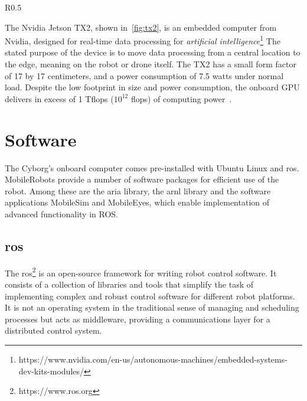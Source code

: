 \documentclass[\rootfolder/main.tex]{subfiles}
\begin{document}
\begin{wrapfigure}{R}{0.5\columnwidth}
    \caption[Nvidia Jetson TX2 development kit.]{Nvidia Jetson TX2 development kit, image courtesy of Nvidia.}
    \label{fig:tx2}
\end{wrapfigure}

The Nvidia Jetson TX2, shown in~\cref{fig:tx2}, is an embedded computer from Nvidia, designed for real-time data processing for \emph{artificial intelligence}\footnote{https://www.nvidia.com/en-us/autonomous-machines/embedded-systems-dev-kits-modules/}
The stated purpose of the device is to move data processing from a central location to the edge, meaning on the robot or drone itself.
The TX2 has a small form factor of 17 by 17 centimeters, and a power consumption of 7.5 watts under normal load.
Despite the low footprint in size and power consumption, the onboard GPU delivers in excess of 1 T\acrshort{flops} ($10^{12}$ \acrlong{flops}) of computing power~\cite{Nvidia2017}.


\section{Software}

The Cyborg's onboard computer comes pre-installed with Ubuntu Linux and \acrshort{ros}.
MobileRobots provide a number of software packages for efficient use of the robot. 
Among these are the \acrfull{aria} library, the \acrfull{arnl} library and the software applications MobileSim and MobileEyes, which enable implementation of advanced functionality in ROS.


\subsection{\acrfull{ros}}

The \acrfull{ros}\footnote{https://www.ros.org} is an open-source framework for writing robot control software.
It consists of a collection of libraries and tools that simplify the task of implementing complex and robust control software for different robot platforms.
It is not an operating system in the traditional sense of managing and scheduling processes but acts as middleware, providing a communications layer for a distributed control system.
\end{document}
